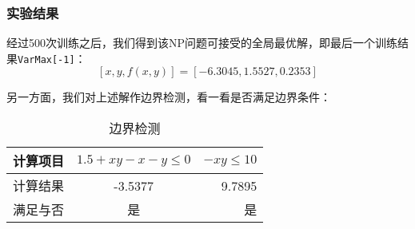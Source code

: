 \documentclass[12pt]{article}
\begin{document}
\subsubsection{实验结果}
经过500次训练之后，我们得到该NP问题可接受的全局最优解，即最后一个训练结果\texttt{VarMax[-1]}：
\begin{equation}
\left[x,y,f\left(x,y\right)\right]= \left[-6.3045 , 1.5527 ,0.2353 \right]
\end{equation}\par
另一方面，我们对上述解作边界检测，看一看是否满足边界条件：
\begin{table}[H]
\centering
\caption{边界检测}
\begin{tabular}{lcr}
\toprule
计算项目&$1.5+xy - x - y \le 0$&$-xy\le 10$
\\\midrule
计算结果&-3.5377 &  9.7895\\
满足与否&是&是
\\\bottomrule
\end{tabular}
\end{table}
\end{document}
